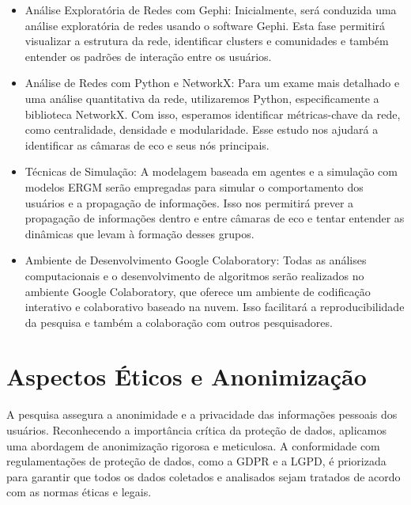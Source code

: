\begin{itemize}
	\item Análise Exploratória de Redes com Gephi: Inicialmente, será conduzida uma análise exploratória de redes usando o software Gephi. Esta fase permitirá visualizar a estrutura da rede, identificar clusters e comunidades e também entender os padrões de interação entre os usuários.
	\item Análise de Redes com Python e NetworkX: Para um exame mais detalhado e uma análise quantitativa da rede, utilizaremos Python, especificamente a biblioteca NetworkX. Com isso, esperamos identificar métricas-chave da rede, como centralidade, densidade e modularidade. Esse estudo nos ajudará a identificar as câmaras de eco e seus nós principais.
	\item Técnicas de Simulação: A modelagem baseada em agentes e a simulação com modelos ERGM serão empregadas para simular o comportamento dos usuários e a propagação de informações. Isso nos permitirá prever a propagação de informações dentro e entre câmaras de eco e tentar entender as dinâmicas que levam à formação desses grupos.
	\item Ambiente de Desenvolvimento Google Colaboratory: Todas as análises computacionais e o desenvolvimento de algoritmos serão realizados no ambiente Google Colaboratory, que oferece um ambiente de codificação interativo e colaborativo baseado na nuvem. Isso facilitará a reproducibilidade da pesquisa e também a colaboração com outros pesquisadores.
\end{itemize}

\section{Aspectos Éticos e Anonimização}
\label{sec:anonimizacao}

A pesquisa assegura a anonimidade e a privacidade das informações pessoais dos usuários. Reconhecendo a importância crítica da proteção de dados, aplicamos uma abordagem de anonimização rigorosa e meticulosa. A conformidade com regulamentações de proteção de dados, como a GDPR e a LGPD, é priorizada para garantir que todos os dados coletados e analisados sejam tratados de acordo com as normas éticas e legais.

